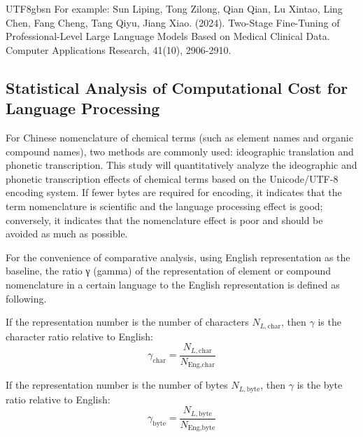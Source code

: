 \documentclass[conference]{IEEEtran}
\begin{document}
\begin{CJK*}{UTF8}{gbsn}
For example: Sun Liping, Tong Zilong, Qian Qian, Lu Xintao, Ling Chen, Fang Cheng, Tang Qiyu, Jiang Xiao. (2024). Two-Stage Fine-Tuning of Professional-Level Large Language Models Based on Medical Clinical Data. Computer Applications Research, 41(10), 2906-2910.

\subsection{Statistical Analysis of Computational Cost for Language Processing}
For Chinese nomenclature of chemical terms (such as element names and organic compound names), two methods are commonly used: ideographic translation and phonetic transcription. This study will quantitatively analyze the ideographic and phonetic transcription effects of chemical terms based on the Unicode/UTF-8 encoding system. If fewer bytes are required for encoding, it indicates that the term nomenclature is scientific and the language processing effect is good; conversely, it indicates that the nomenclature effect is poor and should be avoided as much as possible.

For the convenience of comparative analysis, using English representation as the baseline, the ratio γ (gamma) of the representation of element or compound nomenclature in a certain language to the English representation is defined as following.

If the representation number is the number of characters $N_{L,\text{char}}$, then $\gamma$ is the character ratio relative to English:
\begin{equation}
\gamma_{\text{char}} = \frac{N_{L,\text{char}}}{N_{\text{Eng},\text{char}}}
\label{eq:char_ratio}
\end{equation}

If the representation number is the number of bytes $N_{L,\text{byte}}$, then $\gamma$ is the byte ratio relative to English:
\begin{equation}
\gamma_{\text{byte}} = \frac{N_{L,\text{byte}}}{N_{\text{Eng},\text{byte}}}
\label{eq:byte_ratio}
\end{equation}


\end{CJK*}
\end{document}
